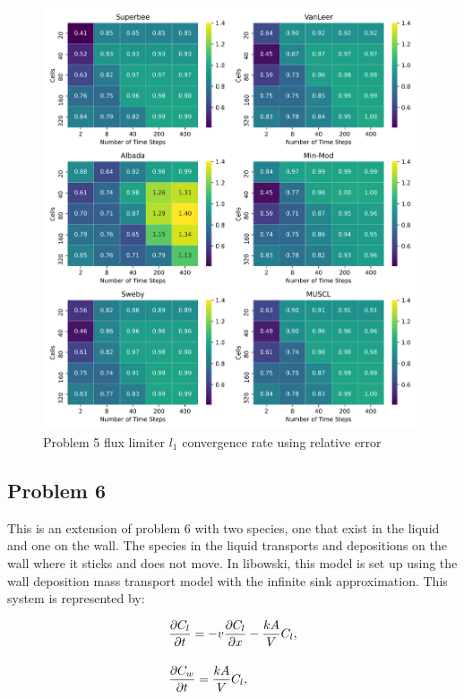 \begin{figure}[p]
    \centering
    \includegraphics[width=6in]{images/chapter-5/problem5FluxLimiterConvergenceRate.png}
    \caption{Problem 5 flux limiter $l_{1}$ convergence rate using relative error}
    \label{fig:problem5_fluxlimiter_convergence_rate}
\end{figure}

\clearpage

\subsection{Problem 6}
This is an extension of problem 6 with two species, one that exist in the liquid and one on the wall. The species in the liquid transports and depositions on the wall where it sticks and does not move. In libowski, this model is set up using the wall deposition mass transport model with the infinite sink approximation. This system is represented by:

\begin{equation}
\setlength{\jot}{15pt}
\begin{split}
    &\frac{\partial C_{l}}{\partial t} = -v\frac{\partial C_{l}}{\partial x} - \frac{kA}{V} C_{l}, \\
    &\frac{\partial C_{w}}{\partial t} = \frac{kA}{V} C_{l},
\end{split}
\end{equation}

